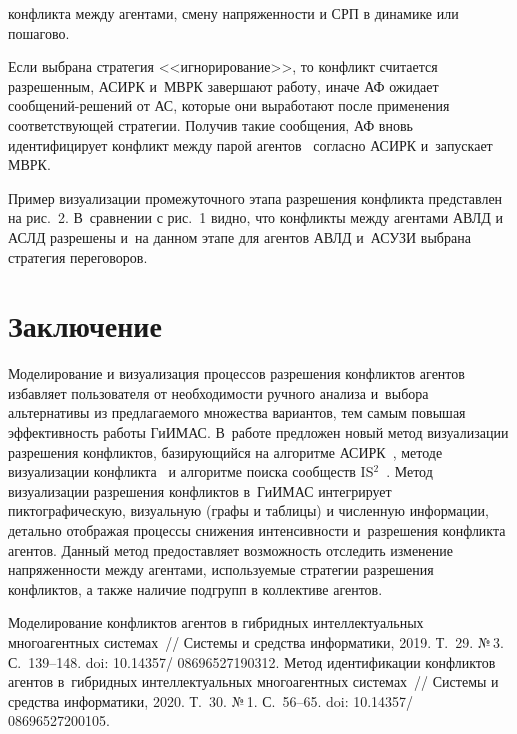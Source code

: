\begin{multicols}{2}
\columnbreak

\noindent
 конфликта 
между агентами, смену напряженности и СРП в динамике или пошагово.
  
  Если выбрана стратегия <<игнорирование>>, то конфликт считается 
разрешенным, АСИРК и~\mbox{МВРК} завершают работу, иначе АФ ожидает  
со\-об\-ще\-ний-ре\-ше\-ний от АС, которые они выработают после применения 
соответствующей стратегии. Получив такие сообщения, АФ вновь 
идентифицирует конфликт между парой агентов~\cite{4-kir} согласно АСИРК 
и~запускает МВРК.
  
  Пример визуализации промежуточного этапа разрешения конфликта 
представлен на рис.~2. В~сравнении с рис.~1 видно, что конфликты между 
агентами АВЛД и АСЛД разрешены и~на данном этапе для агентов АВЛД 
и~АСУЗИ выбрана стратегия переговоров.
  
 

\section{Заключение}
  
  Моделирование и визуализация процессов разрешения конфликтов агентов 
избавляет пользователя от необходимости ручного анализа и~выбора\linebreak 
альтернативы из предлагаемого множества вариантов, тем самым повышая 
эффективность работы \mbox{ГиИМАС}. В~работе предложен новый метод 
визуализации разрешения конфликтов, ба\-зи\-ру\-ющий\-ся на алгоритме 
АСИРК~\cite{4-kir}, методе визуализации конфликта~\cite{5-kir} и алгоритме 
поиска сообществ IS$^2$~\cite{14-kir, 15-kir}. Метод визуализации разрешения конфликтов в~\mbox{ГиИМАС} 
интегрирует пиктографическую, визуальную (графы и таблицы) и численную 
информации, детально отображая процессы снижения интенсивности 
и~разрешения конфликта агентов. Данный метод предоставляет возможность 
отследить изменение напряженности между агентами, используемые стратегии 
разрешения конфликтов, а также наличие подгрупп в коллективе агентов.
  
{\small\frenchspacing
 {%
 \begin{thebibliography}{99}
 Моделирование конфликтов агентов в гибридных 
интеллектуальных многоагентных сис\-те\-мах~// Сис\-те\-мы и средства информатики, 2019. 
Т.~29. №\,3. С.~139--148. doi: 10.14357/ 08696527190312.
 Метод идентификации конфликтов агентов 
в~гибридных интеллектуальных многоагентных сис\-те\-мах~// Сис\-те\-мы и средства 
информатики, 2020. Т.~30. №\,1. С.~56--65. doi: 10.14357/ 08696527200105.


\end{thebibliography}}}
\end{multicols}
